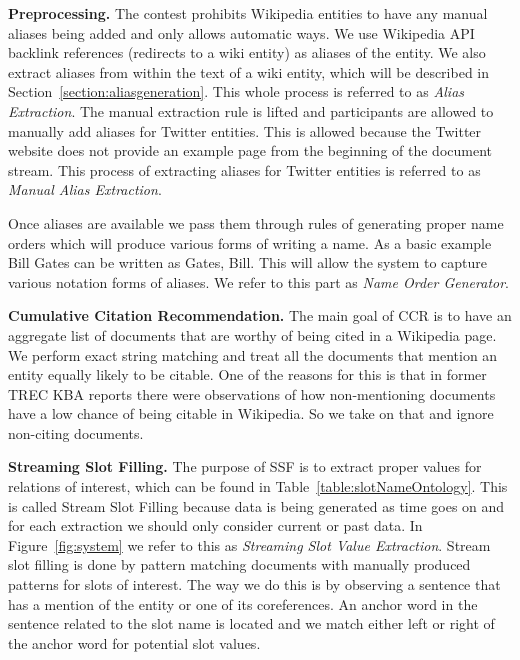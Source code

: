 \textbf{Preprocessing.}
\label{sec:preproc}
The contest prohibits Wikipedia entities to have any manual aliases being added and only allows automatic ways. We use Wikipedia API backlink references (redirects to a wiki entity) as aliases of the entity. We also extract aliases from within the text of a wiki entity, which will be described in Section~\ref{section:aliasgeneration}. This whole process is referred to as \textit{Alias Extraction}. The manual extraction rule is lifted and participants are allowed to manually add aliases for Twitter entities. This is allowed because the Twitter website does not provide an example page from the beginning of the document stream. This process of extracting aliases for Twitter entities is referred to as \textit{Manual Alias Extraction}.

Once aliases are available we pass them through rules of generating proper name orders which will produce various forms of writing a name. As a basic example Bill Gates can be written as Gates, Bill. This will allow the system to capture various notation forms of aliases. We refer to this part as \textit{Name Order Generator}.

\textbf{Cumulative Citation Recommendation.}
\label{sec:ccr1}
The main goal of CCR is to have an aggregate list of documents that are worthy of being cited in a Wikipedia page. We perform exact string matching and treat all the documents that mention an entity equally likely to be citable. One of the reasons for this is that in former TREC KBA reports \cite{JFrank12} there were observations of how non-mentioning documents have a low chance of being citable in Wikipedia. So we take on that and ignore non-citing documents. 






\textbf{Streaming Slot Filling.}
\label{sec:ssf1}
The purpose of SSF is to extract proper values for relations of interest, which can be found in Table~\ref{table:slotNameOntology}. This is called Stream Slot Filling because data is being generated as time goes
on and for each extraction we should only consider current or past data. In Figure~\ref{fig:system} we refer to this as \textit{Streaming Slot Value Extraction}. Stream slot filling is done by pattern matching documents with manually produced patterns for slots of interest. The way we do this is by observing a sentence that has a mention of the entity or one of its coreferences. An anchor word in the sentence related to the slot name is located and we match either left or right of the anchor word for potential slot values. 

